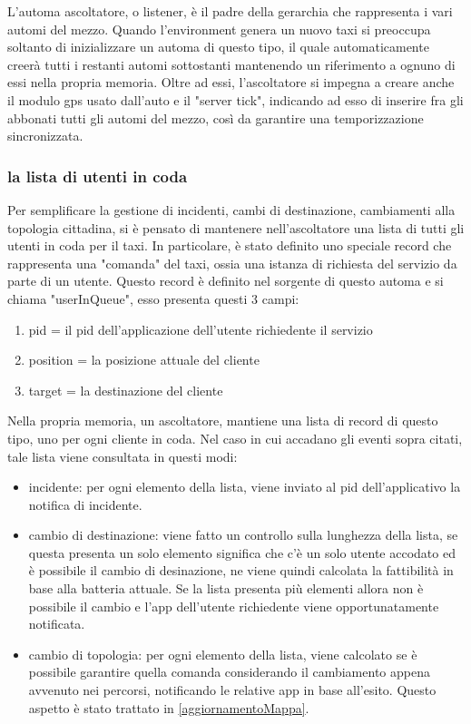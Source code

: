 L'automa ascoltatore, o listener, è il padre della gerarchia che rappresenta i vari automi del mezzo. Quando l'environment genera un nuovo taxi si preoccupa soltanto di inizializzare un automa di questo tipo, il quale automaticamente creerà tutti i restanti automi sottostanti mantenendo un riferimento a ognuno di essi nella propria memoria. Oltre ad essi, l'ascoltatore si impegna a creare anche il modulo gps usato dall'auto e il "server tick", indicando ad esso di inserire fra gli abbonati tutti gli automi del mezzo, così da garantire una temporizzazione sincronizzata. 

\subsubsection{la lista di utenti in coda} \label{usersInQueue}

Per semplificare la gestione di incidenti, cambi di destinazione, cambiamenti alla topologia cittadina, si è pensato di mantenere nell'ascoltatore una lista di tutti gli utenti in coda per il taxi. In particolare, è stato definito uno speciale record che rappresenta una "comanda" del taxi, ossia una istanza di richiesta del servizio da parte di un utente.
Questo record è definito nel sorgente di questo automa e si chiama "userInQueue", esso presenta questi 3 campi:

\begin{enumerate}
	\item pid = il pid dell'applicazione dell'utente richiedente il servizio
	\item position = la posizione attuale del cliente 
	\item target = la destinazione del cliente
\end{enumerate}

Nella propria memoria, un ascoltatore, mantiene una lista di record di questo tipo, uno per ogni cliente in coda.
Nel caso in cui accadano gli eventi sopra citati, tale lista viene consultata in questi modi:
\begin{itemize}
	\item incidente: per ogni elemento della lista, viene inviato al pid dell'applicativo la notifica di incidente.
	\item cambio di destinazione: viene fatto un controllo sulla lunghezza della lista, se questa presenta un solo elemento significa che c'è un solo utente accodato ed è possibile il cambio di desinazione, ne viene quindi calcolata la fattibilità in base alla batteria attuale. Se la lista presenta più elementi allora non è possibile il cambio e l'app dell'utente richiedente viene opportunatamente notificata.
	\item cambio di topologia: per ogni elemento della lista, viene calcolato se è possibile garantire quella comanda considerando il cambiamento appena avvenuto nei percorsi, notificando le relative app in base all'esito. Questo aspetto è stato trattato in \ref{aggiornamentoMappa}.
\end{itemize}

